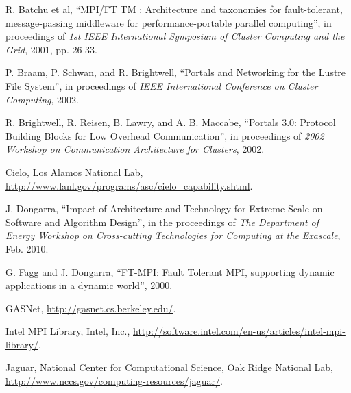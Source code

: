 \documentclass[conference]{IEEEtran}
\begin{document}

%
%
%
\begin{thebibliography}{30}

R. Batchu et al, ``MPI/FT TM : Architecture and taxonomies for fault-tolerant,
message-passing middleware for performance-portable parallel computing'', in proceedings
of \emph{1st IEEE International Symposium of Cluster Computing and the Grid}, 2001, pp.
26-33.

P. Braam, P. Schwan, and R. Brightwell, ``Portals and Networking for the Lustre File
System'', in proceedings of \emph{IEEE International Conference on Cluster Computing},
2002.

R. Brightwell, R. Reisen, B. Lawry, and A. B. Maccabe, ``Portals 3.0: Protocol Building
Blocks for Low Overhead Communication'', in proceedings of \emph{2002 Workshop on
Communication Architecture for Clusters}, 2002.

Cielo, Los Alamos National Lab, \url{http://www.lanl.gov/programs/asc/cielo_capability.shtml}.

J. Dongarra, ``Impact of Architecture and Technology for Extreme Scale on Software
and Algorithm Design'', in the proceedings of \emph{The Department of Energy Workshop on
Cross-cutting Technologies for Computing at the Exascale}, Feb. 2010.

G. Fagg and J. Dongarra, ``FT-MPI: Fault Tolerant MPI, supporting dynamic applications in
a dynamic world'', 2000.

GASNet, \url{http://gasnet.cs.berkeley.edu/}.

Intel MPI Library, Intel, Inc.,
\url{http://software.intel.com/en-us/articles/intel-mpi-library/}.

Jaguar, National Center for Computational Science, Oak Ridge National Lab,
\url{http://www.nccs.gov/computing-resources/jaguar/}.


\end{thebibliography}
\end{document}

